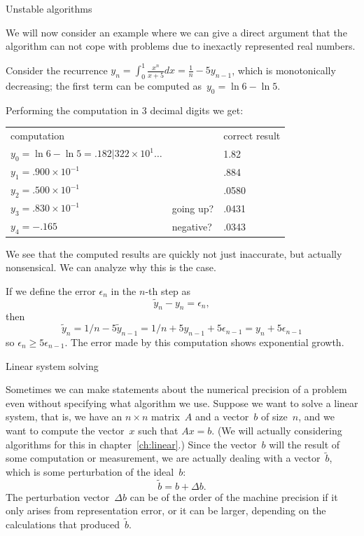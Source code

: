  {Unstable algorithms}

We will now consider an example where we can give a direct argument
that the algorithm can not cope with problems due to inexactly
represented real numbers.

Consider the recurrence
$y_n=\int_0^1 \frac{x^n}{x+5}dx = \frac1n-5y_{n-1}$,
which is monotonically decreasing; the first term can
be computed as~$y_0=\ln 6 - \ln 5$.

Performing the computation in 3 decimal digits we get:

\begin{tabular}{lll}
  computation&&correct result\\
  $y_0=\ln 6 - \ln 5=.182|322\times 10^{1}\ldots$&&1.82\\
  $y_1=.900\times 10^{-1}$&&.884\\
  $y_2=.500\times 10^{-1}$&&.0580\\
  $y_3=.830\times 10^{-1}$&going up?&.0431\\
  $y_4=-.165$&negative?&.0343
\end{tabular}

We see that the computed results are quickly not just inaccurate, but
actually nonsensical. We can analyze why this is the case.

If we define the error $\epsilon_n$ in the $n$-th step as
\begin{equation}
  \tilde y_n-y_n=\epsilon_n,
\end{equation}then
\begin{equation}
  \tilde y_n=1/n-5\tilde y_{n-1}=1/n+5y_{n-1}+5\epsilon_{n-1}
  = y_n+5\epsilon_{n-1}
\end{equation}
so $\epsilon_n\geq 5\epsilon_{n-1}$. The error made by this
computation shows exponential growth.

 {Linear system solving}

Sometimes we can make statements about the numerical precision of a
problem even without specifying what algorithm we use. Suppose we want
to solve a linear system, that is, we have an $n\times n$ matrix~$A$
and a vector~$b$ of size~$n$, and we want to compute the vector~$x$
such that $Ax=b$. (We will actually considering algorithms for this in
chapter~\ref{ch:linear}.) Since the vector~$b$ will the result of some
computation or measurement, we are actually dealing with a
vector~$\tilde b$, which is some perturbation of the ideal~$b$:
\begin{equation}
  \tilde b =  b+\Delta b.
\end{equation}
The perturbation vector~$\Delta b$ can be of the order of the machine
precision if it only arises from representation error, or it can be
larger, depending on the calculations that produced~$\tilde b$.


